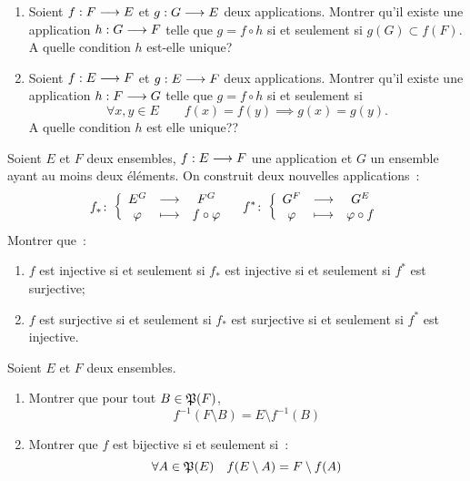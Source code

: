 \begin{exercice}
    \begin{enumerate}
        \item Soient \(f:F \longrightarrow E\) et \(g:G \longrightarrow E\) deux 
            applications. Montrer qu'il existe une application 
            \(h:G \longrightarrow F\) telle que \(g = f \circ h\) si et seulement 
            si \(g(G) \subset f(F)\). A quelle condition \(h\) est-elle unique?
        \item Soient \(f:E \longrightarrow F\) et \(g:E \longrightarrow F\) deux 
            applications. Montrer qu'il existe une application 
            \(h:F \longrightarrow G\) telle que \(g = f \circ h\) si et seulement 
            si 
            \begin{equation}
                \forall x,y \in E \qquad f(x) = f(y) \implies g(x) = g(y).
            \end{equation}
            A quelle condition \(h\) est elle unique??
    \end{enumerate}
\end{exercice}

\begin{exercice}
    Soient \(E\) et \(F\) deux ensembles, \(f:E \longrightarrow F\) une 
    application et \(G\) un ensemble ayant au moins deux éléments. On construit 
    deux nouvelles applications~:
    \begin{equation}
        f_{*}\colon \left\{\begin{array}{ccc} E^G & \longrightarrow &F^G\\ \varphi & \longmapsto & f \circ \varphi \end{array} \right. \quad 
        f^{*}\colon \left\{\begin{array}{ccc} G^F & \longrightarrow &G^E\\ \varphi & \longmapsto & \varphi \circ f \end{array} \right.
    \end{equation}
    Montrer que~:
    \begin{enumerate}
        \item \(f\) est injective si et seulement si \(f_{*}\) est injective si 
            et seulement si \(f^{*}\) est surjective;
        \item \(f\) est surjective si et seulement si \(f_{*}\) est surjective 
            si et seulement si \(f^{*}\) est injective.
    \end{enumerate}
\end{exercice}

\begin{exercice}
    Soient \(E\) et \(F\) deux ensembles.
    \begin{enumerate}
        \item Montrer que pour tout \(B \in \mathfrak{P}(F)\),
            \begin{equation}
                f^{-1}(F\setminus B) = E \setminus f^{-1}(B)
            \end{equation}
        \item Montrer que \(f\) est bijective si et seulement si~:
            \begin{equation}
                \forall A \in \mathfrak{P}(E) \quad f(E\setminus A) = F\setminus f(A)
            \end{equation}
    \end{enumerate}
\end{exercice}

